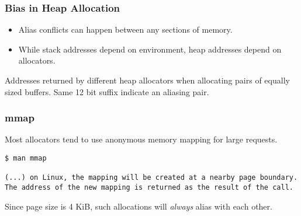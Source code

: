 \documentclass{beamer}
\begin{document}

\begin{frame}[fragile]
\frametitle{Bias in Heap Allocation}

\begin{itemize}
  \item Alias conflicts can happen between any sections of memory.
  \item While stack addresses depend on environment, heap addresses depend on allocators.
\end{itemize}

\begin{table}
  \caption{Addresses returned by different heap allocators when allocating pairs of equally sized buffers. Same 12 bit suffix indicate an aliasing pair.}
\end{table}





\end{frame}

\begin{frame}[fragile]
  \frametitle{mmap}

Most allocators tend to use anonymous memory mapping for large requests.

\begin{lstlisting}[frame=single, xleftmargin=.01\textwidth, xrightmargin=.01\textwidth, belowskip=1cm]
$ man mmap

(...) on Linux, the mapping will be created at a nearby page boundary.
The address of the new mapping is returned as the result of the call.

\end{lstlisting}

Since page size is 4 KiB, such allocations will \emph{always} alias with each other.

\end{frame}
\end{document}
